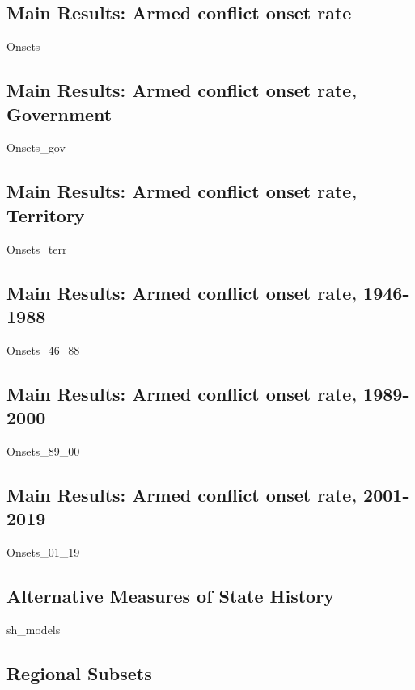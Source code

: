\subsection{Main Results: Armed conflict onset rate}

{Onsets}
\clearpage
    
\subsection{Main Results: Armed conflict onset rate, Government}

{Onsets_gov}
\clearpage
  
\subsection{Main Results: Armed conflict onset rate, Territory}

{Onsets_terr}
\clearpage

\subsection{Main Results: Armed conflict onset rate, 1946-1988}

{Onsets_46_88}
\clearpage
  
\subsection{Main Results: Armed conflict onset rate, 1989-2000}

{Onsets_89_00}
\clearpage

\subsection{Main Results: Armed conflict onset rate, 2001-2019}

{Onsets_01_19}
\clearpage

\subsection{Alternative Measures of State History}

{sh_models}
\clearpage
    
\subsection{Regional Subsets}

